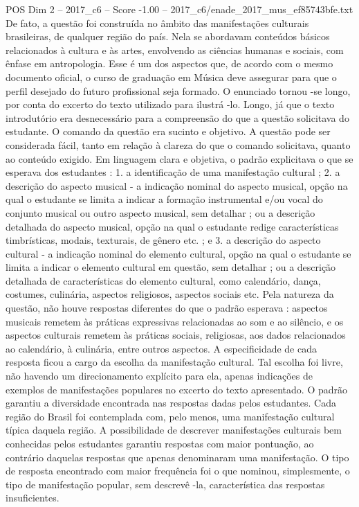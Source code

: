 \begin{textsample}{POS Dim 2 – 2017\_c6 – Score -1.00 – 2017\_c6/enade\_2017\_mus\_ef85743bfe.txt}
De fato, a questão foi construída no âmbito das manifestações culturais brasileiras, de qualquer região do país.
Nela se abordavam conteúdos básicos relacionados à cultura e às artes, envolvendo as ciências humanas e sociais, com ênfase em antropologia.
Esse é um dos aspectos que, de acordo com o mesmo documento oficial, o curso de graduação em Música deve assegurar para que o perfil desejado do futuro profissional seja formado.
O enunciado tornou -se longo, por conta do excerto do texto utilizado para ilustrá -lo.
Longo, já que o texto introdutório era desnecessário para a compreensão do que a questão solicitava do estudante.
O comando da questão era sucinto e objetivo.
A questão pode ser considerada fácil, tanto em relação à clareza do que o comando solicitava, quanto ao conteúdo exigido.
Em linguagem clara e objetiva, o padrão explicitava o que se esperava dos estudantes : 1. a identificação de uma manifestação cultural ; 2. a descrição do aspecto musical - a indicação nominal do aspecto musical, opção na qual o estudante se limita a indicar a formação instrumental e/ou vocal do conjunto musical ou outro aspecto musical, sem detalhar ; ou a descrição detalhada do aspecto musical, opção na qual o estudante redige características timbrísticas, modais, texturais, de gênero etc. ; e 3. a descrição do aspecto cultural - a indicação nominal do elemento cultural, opção na qual o estudante se limita a indicar o elemento cultural em questão, sem detalhar ; ou a descrição detalhada de características do elemento cultural, como calendário, dança, costumes, culinária, aspectos religiosos, aspectos sociais etc.
Pela natureza da questão, não houve respostas diferentes do que o padrão esperava : aspectos musicais remetem às práticas expressivas relacionadas ao som e ao silêncio, e os aspectos culturais remetem às práticas sociais, religiosas, aos dados relacionados ao calendário, à culinária, entre outros aspectos.
A especificidade de cada resposta ficou a cargo da escolha da manifestação cultural.
Tal escolha foi livre, não havendo um direcionamento explícito para ela, apenas indicações de exemplos de manifestações populares no excerto do texto apresentado.
O padrão garantiu a diversidade encontrada nas respostas dadas pelos estudantes.
Cada região do Brasil foi contemplada com, pelo menos, uma manifestação cultural típica daquela região.
A possibilidade de descrever manifestações culturais bem conhecidas pelos estudantes garantiu respostas com maior pontuação, ao contrário daquelas respostas que apenas denominaram uma manifestação.
O tipo de resposta encontrado com maior frequência foi o que nominou, simplesmente, o tipo de manifestação popular, sem descrevê -la, característica das respostas insuficientes.

\end{textsample}
